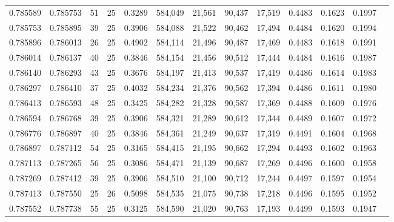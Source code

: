 \begin{tabular}{rrrrrrrrrrrrr}
0.785589 & 0.785753 &    51 &  25 &                                     0.3289 & 584,049 &  21,561 &  90,437 &  17,519 & 0.4483 & 0.1623 & 0.1997 \\
0.785753 & 0.785895 &    39 &  25 &                                     0.3906 & 584,088 &  21,522 &  90,462 &  17,494 & 0.4484 & 0.1620 & 0.1994 \\
0.785896 & 0.786013 &    26 &  25 &                                     0.4902 & 584,114 &  21,496 &  90,487 &  17,469 & 0.4483 & 0.1618 & 0.1991 \\
0.786014 & 0.786137 &    40 &  25 &                                     0.3846 & 584,154 &  21,456 &  90,512 &  17,444 & 0.4484 & 0.1616 & 0.1987 \\
0.786140 & 0.786293 &    43 &  25 &                                     0.3676 & 584,197 &  21,413 &  90,537 &  17,419 & 0.4486 & 0.1614 & 0.1983 \\
0.786297 & 0.786410 &    37 &  25 &                                     0.4032 & 584,234 &  21,376 &  90,562 &  17,394 & 0.4486 & 0.1611 & 0.1980 \\
0.786413 & 0.786593 &    48 &  25 &                                     0.3425 & 584,282 &  21,328 &  90,587 &  17,369 & 0.4488 & 0.1609 & 0.1976 \\
0.786594 & 0.786768 &    39 &  25 &                                     0.3906 & 584,321 &  21,289 &  90,612 &  17,344 & 0.4489 & 0.1607 & 0.1972 \\
0.786776 & 0.786897 &    40 &  25 &                                     0.3846 & 584,361 &  21,249 &  90,637 &  17,319 & 0.4491 & 0.1604 & 0.1968 \\
0.786897 & 0.787112 &    54 &  25 &                                     0.3165 & 584,415 &  21,195 &  90,662 &  17,294 & 0.4493 & 0.1602 & 0.1963 \\
0.787113 & 0.787265 &    56 &  25 &                                     0.3086 & 584,471 &  21,139 &  90,687 &  17,269 & 0.4496 & 0.1600 & 0.1958 \\
0.787269 & 0.787412 &    39 &  25 &                                     0.3906 & 584,510 &  21,100 &  90,712 &  17,244 & 0.4497 & 0.1597 & 0.1954 \\
0.787413 & 0.787550 &    25 &  26 &                                     0.5098 & 584,535 &  21,075 &  90,738 &  17,218 & 0.4496 & 0.1595 & 0.1952 \\
0.787552 & 0.787738 &    55 &  25 &                                     0.3125 & 584,590 &  21,020 &  90,763 &  17,193 & 0.4499 & 0.1593 & 0.1947 \\

\end{tabular}
